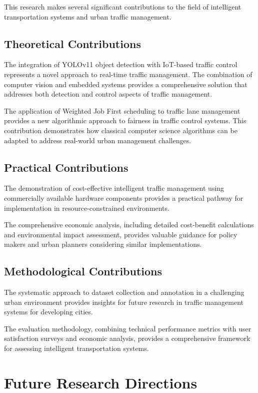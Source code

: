 This research makes several significant contributions to the field of intelligent transportation systems and urban traffic management.

\subsection{Theoretical Contributions}
The integration of YOLOv11 object detection with IoT-based traffic control represents a novel approach to real-time traffic management. The combination of computer vision and embedded systems provides a comprehensive solution that addresses both detection and control aspects of traffic management.

The application of Weighted Job First scheduling to traffic lane management provides a new algorithmic approach to fairness in traffic control systems. This contribution demonstrates how classical computer science algorithms can be adapted to address real-world urban management challenges.

\subsection{Practical Contributions}
The demonstration of cost-effective intelligent traffic management using commercially available hardware components provides a practical pathway for implementation in resource-constrained environments.

The comprehensive economic analysis, including detailed cost-benefit calculations and environmental impact assessment, provides valuable guidance for policy makers and urban planners considering similar implementations.

\subsection{Methodological Contributions}
The systematic approach to dataset collection and annotation in a challenging urban environment provides insights for future research in traffic management systems for developing cities.

The evaluation methodology, combining technical performance metrics with user satisfaction surveys and economic analysis, provides a comprehensive framework for assessing intelligent transportation systems.

\section{Future Research Directions}
\label{sec:future_research}

